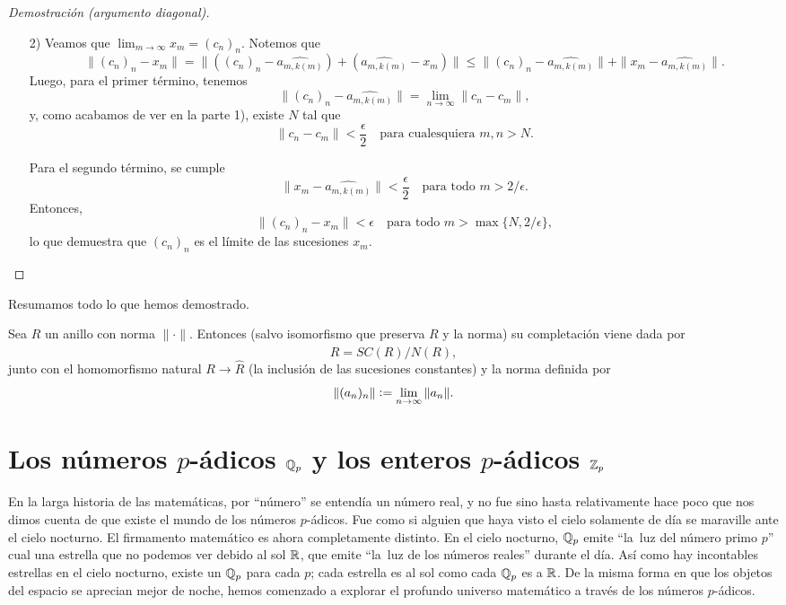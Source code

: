 \documentclass{article}
\numberwithin{equation}{section}
\theoremstyle{definition}
\begin{document}
\begin{lema}
\begin{proof}[Demostración (argumento diagonal)]
\begin{enumerate}
    \item[2)] Veamos que $\lim_{m\to\infty} x_m = (c_n)_n$. Notemos que
      \[ \|(c_n)_n - x_m\| =
         \| ((c_n)_n - \widehat{a_{m, k(m)}}) + (\widehat{a_{m, k(m)}} - x_m) \| \le
         \|(c_n)_n - \widehat{a_{m, k(m)}}\| + \|x_m - \widehat{a_{m, k(m)}}\|. \]
      Luego, para el primer término, tenemos
      $$\|(c_n)_n - \widehat{a_{m, k(m)}}\| = \lim_{n\to\infty} \|c_n - c_m\|,$$
      y, como acabamos de ver en la parte 1), existe $N$ tal que
      \[ \|c_n - c_m\| < \frac{\epsilon}{2}
         \quad\text{para cualesquiera }m,n > N. \]

      Para el segundo término, se cumple
      \[ \|x_m - \widehat{a_{m, k(m)}}\| < \frac{\epsilon}{2}
         \quad\text{para todo }m > 2/\epsilon. \]
      Entonces,
      \[ \|(c_n)_n - x_m\| < \epsilon
         \quad\text{para todo }m > \max \{N, 2/\epsilon\}, \]
      lo que demuestra que $(c_n)_n$ es el límite de las sucesiones $x_m$. \qedhere
    \end{enumerate}
  \end{proof}
\end{lema}

Resumamos todo lo que hemos demostrado.

\begin{teorema}
  \label{thm:existencia-de-completacion}
  Sea $R$ un anillo con norma $\|\cdot\|$. Entonces (salvo isomorfismo que
  preserva $R$ y la norma) su completación viene dada por
  $$\widehat{R} = SC (R) / N (R),$$
  junto con el homomorfismo natural $R \to \widehat{R}$ (la inclusión de
  las sucesiones constantes) y la norma definida por
  $$\|(a_n)_n\| \mathrel{\mathop:}= \lim_{n\to\infty} \|a_n\|.$$
\end{teorema}


\section{Los números $p$-ádicos $\mathbb{Q}_p$ y los enteros $p$-ádicos $\mathbb{Z}_p$}

\epigraph{En la larga historia de las matemáticas, por ``número'' se entendía
  un número real, y no fue sino hasta relativamente hace poco que nos dimos
  cuenta de que existe el mundo de los números $p$-ádicos. Fue como si alguien
  que haya visto el cielo solamente de día se maraville ante el cielo
  nocturno. El firmamento matemático es ahora completamente distinto.
  En el cielo nocturno, $\mathbb{Q}_p$ emite ``la~luz del número primo $p$'' cual
  una estrella que no podemos ver debido al sol $\mathbb{R}$, que emite ``la~luz de
  los números reales'' durante el día. Así como hay incontables estrellas en
  el cielo nocturno, existe un $\mathbb{Q}_p$ para cada $p$; cada estrella es al sol
  como cada $\mathbb{Q}_p$ es a $\mathbb{R}$. De la misma forma en que los objetos del espacio
  se aprecian mejor de noche, hemos comenzado a explorar el profundo universo
  matemático a través de los números $p$-ádicos.}{\cite[\S 2.4]{Kato-NT-1}}
\end{document}
